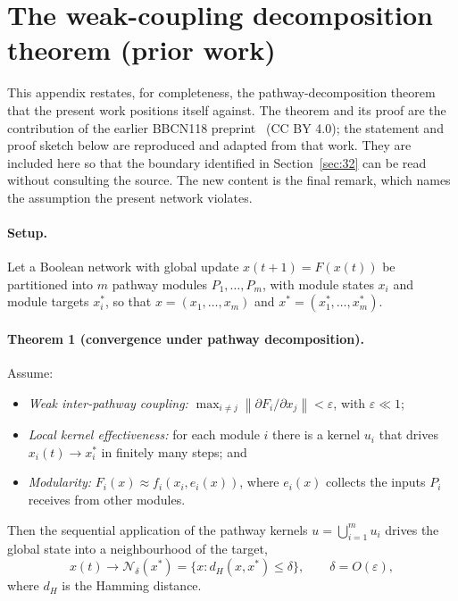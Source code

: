 \section{The weak-coupling decomposition theorem (prior work)}
\label{app:theorem}

This appendix restates, for completeness, the pathway-decomposition theorem that the present
work positions itself against. The theorem and its proof are the contribution of the earlier
BBCN118 preprint~\cite{bhatti2026} (CC BY 4.0); the statement and proof sketch below are
reproduced and adapted from that work. They are included here so that the boundary identified
in Section~\ref{sec:32} can be read without consulting the source. The new content is the final
remark, which names the assumption the present network violates.

\paragraph{Setup.} Let a Boolean network with global update $x(t{+}1)=F(x(t))$ be partitioned into
$m$ pathway modules $P_1,\dots,P_m$, with module states $x_i$ and module targets $x_i^{*}$, so that
$x=(x_1,\dots,x_m)$ and $x^{*}=(x_1^{*},\dots,x_m^{*})$.

\paragraph{Theorem 1 (convergence under pathway decomposition).} Assume:
\begin{itemize}
\item[(A1)] \emph{Weak inter-pathway coupling:} $\displaystyle\max_{i\neq j}\left\|\partial F_i/\partial x_j\right\| < \varepsilon$, with $\varepsilon \ll 1$;
\item[(A2)] \emph{Local kernel effectiveness:} for each module $i$ there is a kernel $u_i$ that drives $x_i(t)\to x_i^{*}$ in finitely many steps; and
\item[(A3)] \emph{Modularity:} $F_i(x)\approx f_i\!\left(x_i, e_i(x)\right)$, where $e_i(x)$ collects the inputs $P_i$ receives from other modules.
\end{itemize}
Then the sequential application of the pathway kernels $u=\bigcup_{i=1}^{m} u_i$ drives the global
state into a neighbourhood of the target,
\[
x(t)\to \mathcal{N}_\delta(x^{*})=\{x : d_H(x,x^{*})\le \delta\},\qquad \delta = O(\varepsilon),
\]
where $d_H$ is the Hamming distance.

